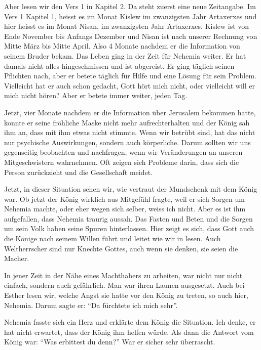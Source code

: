 \documentclass[fontsize=16pt]{mybib}
\begin{document}

Aber lesen wir den Vers 1 in Kapitel 2. Da steht zuerst eine neue Zeitangabe. Im Vers 1 Kapitel 1, heisst es im Monat Kislew im zwanzigsten Jahr Artaxerxes und hier heisst es im Monat Nisan, im zwanzigsten Jahr Artaxerxes. Kislew ist von Ende November bis Anfangs Dezember und Nisan ist nach unserer Rechnung von Mitte März bis Mitte April. Also 4 Monate nachdem er die Information von seinem Bruder bekam. Das Leben ging in der Zeit für Nehemia weiter. Er hat damals nicht alles hingeschmissen und ist abgereist. Er ging täglich seinen Pflichten nach, aber er betete täglich für Hilfe und eine Lösung für sein Problem. Vielleicht hat er auch schon gedacht, Gott hört mich nicht, oder vielleicht will er mich nicht hören? Aber er betete immer weiter, jeden Tag.

Jetzt, vier Monate nachdem er die Information über Jerusalem bekommen hatte, konnte er seine fröhliche Maske nicht mehr aufrechterhalten und der König sah ihm an, dass mit ihm etwas nicht stimmte. Wenn wir betrübt sind, hat das nicht nur psychische Auswirkungen, sondern auch körperliche. Darum sollten wir uns gegenseitig beobachten und nachfragen, wenn wir Veränderungen an unseren Mitgeschwistern wahrnehmen. Oft zeigen sich Probleme darin, dass sich die Person zurückzieht und die Gesellschaft meidet.

Jetzt, in dieser Situation sehen wir, wie vertraut der Mundschenk mit dem König war. Ob jetzt der König wirklich aus Mitgefühl fragte, weil er sich Sorgen um Nehemia machte, oder eher wegen sich selber, weiss ich nicht. Aber es ist ihm aufgefallen, dass Nehemia traurig aussah. Das Fasten und Beten und die Sorgen um sein Volk haben seine Spuren hinterlassen. Hier zeigt es sich, dass Gott auch die Könige nach seinem Willen führt und leitet wie wir in  lesen. Auch Weltherrscher sind nur Knechte Gottes, auch wenn sie denken, sie seien die Macher.

In jener Zeit in der Nähe eines Machthabers zu arbeiten, war nicht nur nicht einfach, sondern auch gefährlich. Man war ihren Launen ausgesetzt. Auch bei Esther lesen wir, welche Angst sie hatte vor den König zu treten,  so auch hier, Nehemia. Darum sagte er: \enquote{Da fürchtete ich mich sehr}.

Nehemia fasste sich ein Herz und erklärte dem König die Situation. Ich denke, er hat nicht erwartet, dass der König ihm helfen würde. Als dann die Antwort vom König war: \enquote{Was erbittest du denn?} War er sicher sehr überrascht.
\end{document}
